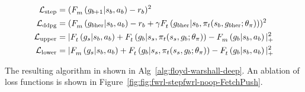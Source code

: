 %
\begin{align}
      \Loss_{\text{step}} &= (\fwargs{\state_{b}}{\act_{b}}{\goal_{b+1}}{m}{} - \rew_b)^2
                             \\
  \Loss_{\text{ddpg}} &= (\fwargs{\state_{b}}{\act_{b}}{\goal_{b\text{her}}}{m}{} -
      \rew_b + \discount\fwargs{\state_{b}}{\policy_t(\state_b, \goal_{b\text{her}};\param_\policy)}{\goal_{b\text{her}}}{t}{})^2
                        \\
  \Loss_{\text{upper}} &= |
      \fwargs{\state_{b}}{\act_b}{\goal_s}{t}{}
      + \fwargs{\state_{s}}{\policy_t(\state_s, \goal_{b};\param_\policy)}{\goal_b}{t}{}
      - \fwargs{\state_{b}}{\act_b}{\goal_b}{m}{}
      |_+^2
                         \\
  \Loss_{\text{lower}} &= |
      \fwargs{\state_{b}}{\act_b}{\goal_s}{m}{}
      + \fwargs{\state_{s}}{\policy_t(\state_s, \goal_{b};\param_\policy)}{\goal_b}{t}{}
      - \fwargs{\state_{b}}{\act_b}{\goal_b}{t}{}
      |_+^2
\end{align}%
% 

The resulting algorithm in shown in Alg~\ref{alg:floyd-warshall-deep}. An
ablation of loss functions is shown in Figure~\ref{fig:fig:fwrl-stepfwrl-noop-FetchPush}.




